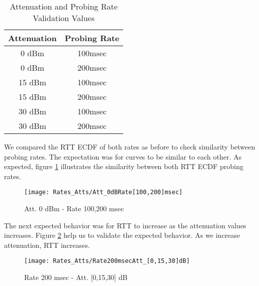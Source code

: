 \begin{table}[h]
\begin{center}
	\begin{tabular}{||c c||}
		\hline
		Attenuation & Probing Rate\\ [0.5ex] 
		\hline\hline
		0 dBm & 100msec\\ 
		\hline
		0 dBm & 200msec\\
		\hline
		15 dBm & 100msec\\
		\hline
		15 dBm & 200msec\\
		\hline
		30 dBm & 100msec\\
		\hline
		30 dBm & 200msec\\ [1ex] 
		\hline
	\end{tabular}
\end{center}
\caption{Attenuation and Probing Rate Validation Values}
\label{table:Att_Rate_Test_Values}
\end{table}

We compared the RTT ECDF of both rates as before to check similarity between probing rates. The expectation was for curves to be similar to each other. As expected, figure \ref{image:att_0_100and200msec} illustrates the similarity between both RTT ECDF probing rates.

\begin{figure}[h]
	\centering
	\texttt{[image: Rates\_Atts/Att\_0dBRate[100,200]msec]}
	\caption{Att. 0 dBm - Rate 100,200 msec}
	\label{image:att_0_100and200msec}
\end{figure}

The next expected behavior was for RTT to increase as the attenuation values increases. Figure \ref{image:rate_200msec_Att_0_15_30dBm} help us to validate the expected behavior. As we increase attenuation, RTT increases.

\begin{figure}[h]
	\centering
	\texttt{[image: Rates\_Atts/Rate200msecAtt\_[0,15,30]dB]}
	\caption{Rate 200 msec - Att. [0,15,30] dB}
	\label{image:rate_200msec_Att_0_15_30dBm}
\end{figure}

\newpage